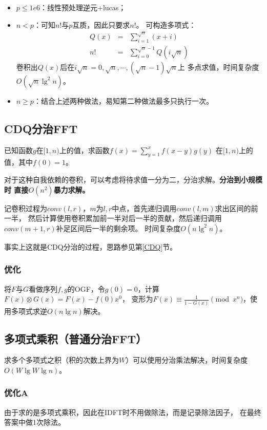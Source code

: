 \begin{itemize}
    \item $p\leq 1e6$：线性预处理逆元+lucas；
    \item $n<p$：可知$n!$与$p$互质，因此只要求$n!$。
    可构造多项式：
    \begin{eqnarray*}
        Q(x)&=&\sum_{i=1}^{\sqrt{n}}{(x+i)}\\
        n!&=&\sum_{i=0}^{\sqrt{n}-1}{Q(i\sqrt{n})}
    \end{eqnarray*}
    卷积出$Q(x)$后在$i\sqrt{n}=0,\sqrt{n},\cdots,(\sqrt{n}-1)\sqrt{n}$上
    多点求值，时间复杂度\\$O(\sqrt{n}\lg^2 n)$。
    \item $n\geq p$：结合上述两种做法，易知第二种做法最多只执行一次。
\end{itemize}

\subsection{CDQ分治FFT}
已知函数$g$在$[1,n)$上的值，求函数$f(x)=\displaystyle \sum_{y=1}^x{f(x-y)g(y)}$
在$[1,n)$上的值，其中$f(0)=1$。

对于这种自我依赖的卷积，可以考虑将待求值一分为二，分治求解。{\bfseries 分治到小规模时
直接$O(n^2)$暴力求解。}

记卷积过程为$conv(l,r)$，$m$为$l,r$中点，首先递归调用$conv(l,m)$求出区间的前一半，
然后计算使用卷积累加前一半对后一半的贡献，然后递归调用$conv(m+1,r)$补足区间后一半的剩余项。
时间复杂度$O(n\lg^2 n)$。

事实上这就是CDQ分治的过程，思路参见第\ref{CDQ}节。

\subsubsection{优化}
将$F$与$G$看做序列$f,g$的OGF，令$g(0)=0$，计算$F(x)\otimes G(x)=F(x)-f(0)x^0$，
变形为$F(x)\equiv \frac{1}{1-G(x)} \pmod{x^n}$，使用多项式求逆$O(n\lg n)$解决。

\subsection{多项式乘积（普通分治FFT）}
求多个多项式之积（积的次数上界为$W$）可以使用分治乘法解决，时间复杂度
$O(W\lg W\lg n)$。

\subsubsection{优化A} 由于求的是多项式乘积，因此在IDFT时不用做除法，而是记录除法因子，
在最终答案中做1次除法。

